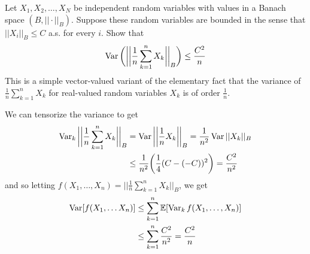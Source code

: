   \begin{exercise}
  Let $X_1, X_2, \ldots, X_N$ be independent random variables with values in a Banach space $(B, ||\cdot ||_B)$. Suppose these random variables are bounded in the sense that $||X_i||_B \leq C$ a.s. for every $i$. Show that 
  \[\operatorname{Var}\bigg( \bigg| \bigg| \frac{1}{n} \sum_{k=1}^n X_k \bigg| \bigg|_B \bigg) \leq \frac{C^2}{n}\]
  This is a simple vector-valued variant of the elementary fact that the variance of $\frac{1}{n} \sum_{k=1}^n X_k$ for real-valued random variables $X_k$ is of order $\frac{1}{n}$. 
  \end{exercise}
  \begin{solution}
  We can tensorize the variance to get 
  \begin{align*}
      \operatorname{Var}_k \bigg| \bigg| \frac{1}{n} \sum_{k=1}^n X_k \bigg| \bigg|_B & = \operatorname{Var} \bigg| \bigg| \frac{1}{n} X_k \bigg| \bigg|_B = \frac{1}{n^2} \operatorname{Var} ||X_k||_B \\
      & \leq \frac{1}{n^2} \bigg( \frac{1}{4} (C - (-C))^2 \bigg) = \frac{C^2}{n^2} 
  \end{align*}
  and so letting $f(X_1, \ldots, X_n) = \big| \big| \frac{1}{n} \sum_{k=1}^n X_k \big| \big|_B$, we get 
  \begin{align*}
      \operatorname{Var} [f(X_1, \ldots X_n)] & \leq \sum_{k=1}^n \mathbb{E}[ \operatorname{Var}_k f (X_1, \ldots, X_n)] \\
      & \leq \sum_{k=1}^n \frac{C^2}{n^2} = \frac{C^2}{n} 
  \end{align*}
  \end{solution}

